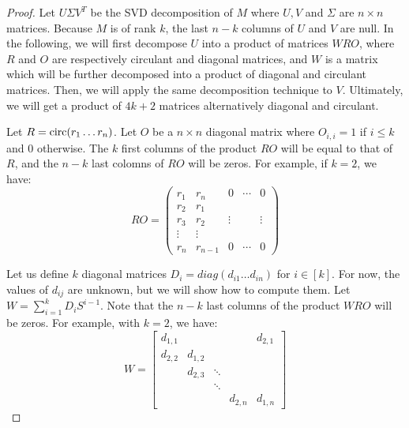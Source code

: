 \begin{proof}
Let $U\Sigma V^{T}$ be the SVD decomposition of $M$ where $U,V$ and $\Sigma$ are $n\times n$ matrices. Because $M$ is of rank $k$, the last $n-k$ columns of $U$ and $V$ are null. In the following, we will first decompose $U$ into a product of matrices $WRO$, where $R$ and $O$ are respectively circulant and diagonal matrices, and $W$ is a matrix which will be further decomposed into a product of diagonal and circulant matrices. Then, we will apply the same decomposition technique to $V$. Ultimately, we will get a product of $4k+2$ matrices alternatively diagonal and circulant.  

Let $R= \mathrm{circ}(r_{1}\ldots r_{n})$. Let $O$ be a $n\times n$ diagonal matrix where $O_{i,i}=1$ if $i\le k$ and $0$ otherwise. The $k$ first columns of the product $RO$ will be equal to that of $R$, and the $n-k$ last colomns of $RO$ will be zeros. For example, if $k=2$, we have: 
\begin{equation}
  RO=\left(\begin{array}{ccccc}
  r_{1} & r_{n} & 0 & \cdots & 0\\
  r_{2} & r_{1}\\
  r_{3} & r_{2} & \vdots &  & \vdots\\
  \vdots & \vdots\\
  r_{n} & r_{n-1} & 0 & \cdots & 0
  \end{array}\right)
\end{equation}

Let us define $k$ diagonal matrices $D_{i}=diag(d_{i1}\ldots d_{in})$ for $i\in[k]$. For now, the values of $d_{ij}$ are unknown, but we will show how to compute them. Let $W=\sum_{i=1}^{k}D_{i}S^{i-1}$.  Note that the $n-k$ last columns of the product $WRO$ will be zeros.  For example, with $k=2$, we have: 
\begin{equation}
  W = \left[ \begin{array}{ccccc}
  d_{1,1} &  &  &  & d_{2,1} \\
  d_{2,2} & d_{1,2} \\
   & d_{2,3} & \ddots \\
   &  & \ddots \\
   &  &  & d_{2,n} & d_{1,n}
  \end{array}\right]
\end{equation}


\end{proof}
